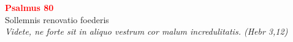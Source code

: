 


\def\greinitialformat#1{%
{\fontsize{39}{39}\selectfont #1}%
}




\vspace{0.3cm}
\begin{center}
 \textcolor{red}{\large \bf Psalmus 80}\\
Sollemnis renovatio foederis\\
\textit{\small Videte, ne forte sit in aliquo vestrum cor malum incredulitatis. (Hebr 3,12)}
\end{center}
